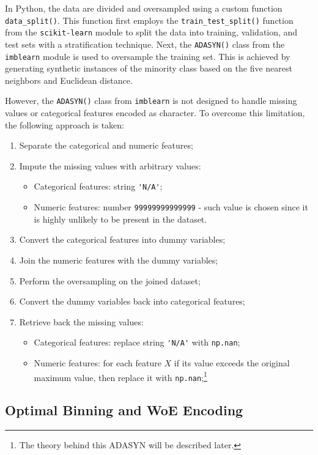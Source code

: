 In Python, the data are divided and oversampled using a custom function \lstinline{data_split()}.
This function first employs the \lstinline{train_test_split()} function from the \lstinline{scikit-learn} module to split the data into training, validation, and test sets with a stratification technique.
Next, the \lstinline{ADASYN()} class from the \lstinline{imblearn} module is used to oversample the training set. This is achieved by generating synthetic instances of the minority class based on the five nearest neighbors and Euclidean distance.

However, the \lstinline{ADASYN()} class from \lstinline{imblearn} is not designed to handle missing values or categorical features encoded as character. To overcome this limitation, the following approach is taken:
\begin{enumerate}
    \item Separate the categorical and numeric features;
    \item Impute the missing values with arbitrary values:
    \begin{itemize}
    \item Categorical features: string \lstinline{'N/A'};
    \item Numeric features: number \lstinline{99999999999999} - such value is chosen since it is highly unlikely to be present in the dataset.
    \end{itemize}
    \item Convert the categorical features into dummy variables;
    \item Join the numeric features with the dummy variables;
    \item Perform the oversampling on the joined dataset;
    \item Convert the dummy variables back into categorical features;
    \item Retrieve back the missing values:
    \begin{itemize}
    \item Categorical features: replace string \lstinline{'N/A'} with \lstinline{np.nan};
    \item Numeric features: for each feature $X$ if its value exceeds the original maximum value, then replace it with \lstinline{np.nan};\footnote{The theory behind this ADASYN will be described later.}
    \end{itemize}
    \end{enumerate}

\subsection{Optimal Binning and WoE Encoding}
\label{subsec:prep-optbinning}


